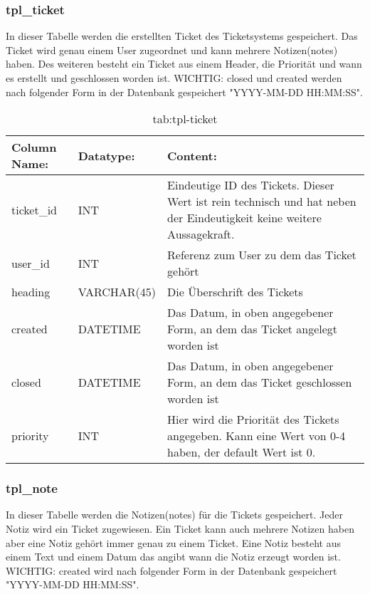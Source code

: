 \subsubsection{tpl\_ticket}

In dieser Tabelle werden die erstellten Ticket des Ticketsystems gespeichert. Das Ticket wird genau einem User zugeordnet und kann mehrere Notizen(notes) haben. Des weiteren besteht ein Ticket aus einem Header, die Priorität und wann es erstellt und geschlossen worden ist.
WICHTIG: closed und created werden nach folgender Form in der Datenbank gespeichert "YYYY-MM-DD HH:MM:SS".

\begin{table}[h]
	\begin{tabular}{|p{3.5cm}|p{4cm}|p{6.2cm}|}
		\hline
		\textbf{Column Name:} & \textbf{Datatype:} & \textbf{Content:}\\
		\hline
		ticket\_id & INT & Eindeutige ID des Tickets. Dieser Wert ist rein technisch und hat neben der Eindeutigkeit keine weitere Aussagekraft.\\
		\hline
		user\_id & INT & Referenz zum User zu dem das Ticket gehört\\
		\hline
		heading & VARCHAR(45) &  Die Überschrift des Tickets\\
		\hline
		created & DATETIME & Das Datum, in oben angegebener Form, an dem das Ticket angelegt worden ist\\
		\hline
		closed & DATETIME & Das Datum, in oben angegebener Form, an dem das Ticket geschlossen worden ist\\
		\hline
		priority & INT & Hier wird die Priorität des Tickets angegeben. Kann eine Wert von 0-4 haben, der default Wert ist 0.\\
		\hline
	\end{tabular}
	\caption{tab:tpl-ticket}
\end{table}
\label{tab:tpl_ticket}

\newpage

\subsubsection{tpl\_note}

In dieser Tabelle werden die Notizen(notes) für die Tickets gespeichert. Jeder Notiz wird ein Ticket zugewiesen. Ein Ticket kann auch mehrere Notizen haben aber eine Notiz gehört immer genau zu einem Ticket. Eine Notiz besteht aus einem Text und einem Datum das angibt wann die Notiz erzeugt worden ist.
WICHTIG: created wird nach folgender Form in der Datenbank gespeichert "YYYY-MM-DD HH:MM:SS".


